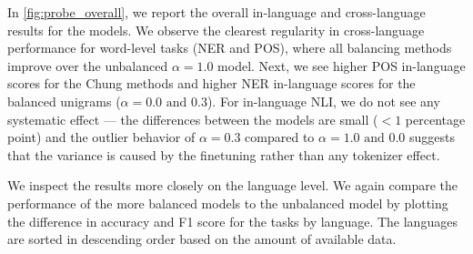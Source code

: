 \begin{figure}
    \label{fig:probe_overall}
\end{figure}

In \autoref{fig:probe_overall}, we report the overall in-language and cross-language results for the models. We observe the clearest regularity in cross-language performance for word-level tasks (NER and POS), where all balancing methods improve over the unbalanced $\alpha=1.0$ model. Next, we see higher POS in-language scores for the Chung methods and higher NER in-language scores for the balanced unigrams ($\alpha=0.0\text{ and }0.3$). For in-language NLI, we do not see any systematic effect --- the differences between the models are small ($<1$ percentage point) and the outlier behavior of $\alpha=0.3$ compared to $\alpha=1.0\text{ and }0.0$ suggests that the variance is caused by the finetuning rather than any tokenizer effect.

We inspect the results more closely on the language level. We again compare the performance of the more balanced models to the unbalanced model by plotting the difference in accuracy and F1 score for the tasks by language. The languages are sorted in descending order based on the amount of available data. 



